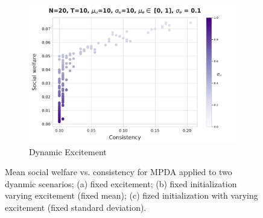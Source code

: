\begin{figure}
\begin{subfigure}[b]{0.49\textwidth}
         \includegraphics[width=\textwidth]{figures/mpda_dynamics_excitement_mean.pdf}
         \caption{Dynamic Excitement}
         \label{fig:excite_mean}
     \end{subfigure}
     \caption{Mean social welfare vs. consistency for MPDA applied to two dyanmic scenarios; (a) fixed excitement; (b) fixed initialization varying excitement (fixed mean); (c) fized initialization with varying excitement (fixed standard deviation).}
    \label{fig:mpda_dynamics}
\end{figure}
